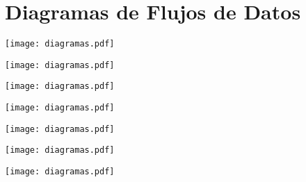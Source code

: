 \section{Diagramas de Flujos de Datos}

\texttt{[image: diagramas.pdf]}

\texttt{[image: diagramas.pdf]}

\texttt{[image: diagramas.pdf]}

\texttt{[image: diagramas.pdf]}

\texttt{[image: diagramas.pdf]}

\texttt{[image: diagramas.pdf]}

\texttt{[image: diagramas.pdf]}

\vfill